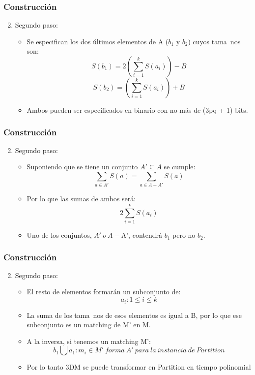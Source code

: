 \documentclass{beamer}
\begin{document}

\begin{frame}
\frametitle{Construcci\'on}
\begin{enumerate}
\setcounter{enumi}{1}
\item Segundo paso:
\begin{itemize}
\item Se especifican los dos \'ultimos elementos de A ($b_{1}$ y $b_{2}$) cuyos tama~{n}os son:
$$S(b_{1}) = 2(\sum\limits_{i=1}^{k}S(a_{i})) - B $$
$$S(b_{2}) = (\sum\limits_{i=1}^{k}S(a_{i})) + B $$
\item Ambos pueden ser especificados en binario con no m\'as de (3pq + 1) bits.
\end{itemize}

\end{enumerate}

\end{frame}


\begin{frame}
\frametitle{Construcci\'on}
\begin{enumerate}
\setcounter{enumi}{1}
\item Segundo paso:
\begin{itemize}
\item Suponiendo que se tiene un conjunto $A' \subseteq A$ se cumple:
$$\sum\limits_{a \in A'} S(a) = \sum\limits_{a \in A - A'} S(a)$$
\item Por lo que las sumas de ambos ser\'a:
$$ 2\sum\limits_{i=1}^{k}S(a_{i})$$
\item Uno de los conjuntos, $A'\ o \ A - $A', contendr\'a $b_{1}$ pero no $b_{2}$.
\end{itemize}

\end{enumerate}

\end{frame}


\begin{frame}
\frametitle{Construcci\'on}
\begin{enumerate}
\setcounter{enumi}{1}
\item Segundo paso:
\begin{itemize}
\item El resto de elementos formar\'an un subconjunto de:
$$a_{i}: 1 \leq i \leq k$$
\item La suma de los tama~{n}os de esos elementos es igual a B, por lo que ese subconjunto es un matching de M' en M.
\item A la inversa, si tenemos un matching M':
$${b_{1} \bigcup {a_{1}}: m_{i} \in M' \ forma \ A' \ para \ la \ instancia \ de \ Partition } $$
\item Por lo tanto 3DM se puede transformar en Partition en tiempo polinomial
\end{itemize}

\end{enumerate}

\end{frame}
\end{document}
